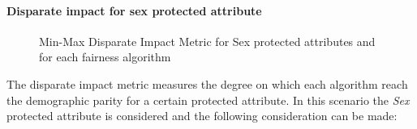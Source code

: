 \paragraph{Disparate impact for sex protected attribute}
\begin{figure}[H]
    \centering
    \caption{Min-Max Disparate Impact Metric for Sex protected attributes and for each fairness algorithm}
\end{figure}

The disparate impact metric measures the degree on which each algorithm reach the demographic parity for a certain protected attribute. In this scenario the \emph{Sex} protected attribute is considered and the following consideration can be made:


